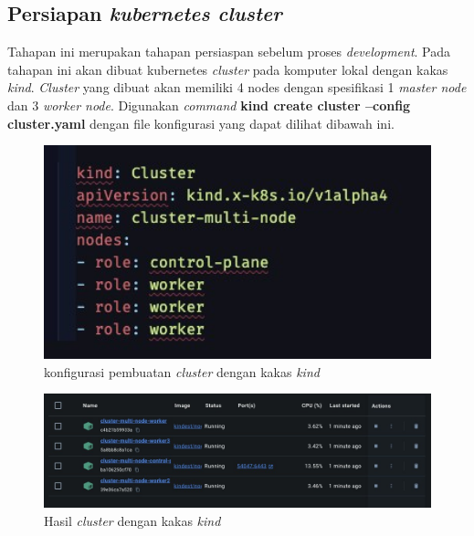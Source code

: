 \subsection{Persiapan \textit{kubernetes cluster}}

Tahapan ini merupakan tahapan persiaspan sebelum proses \textit{development}. Pada tahapan ini akan dibuat kubernetes \textit{cluster} pada komputer lokal dengan kakas \textit{kind}. \textit{Cluster} yang dibuat akan memiliki 4 nodes dengan spesifikasi 1 \textit{master node} dan 3 \textit{worker node}. Digunakan \textit{command} \textbf{kind create cluster --config cluster.yaml} dengan file konfigurasi yang dapat dilihat dibawah ini.

\begin{figure}[ht]
  \centering
  \includegraphics[width=1\textwidth]{resources/appendix/pembuatan-cluster.jpg}
  \caption{konfigurasi pembuatan \textit{cluster} dengan kakas \textit{kind}}
  \label{fig:konfigurasi-pembuatan-cluster}
\end{figure}

\begin{figure}[ht]
  \centering
  \includegraphics[width=1\textwidth]{resources/chapter-4/cluster-kind.jpg}
  \caption{Hasil \textit{cluster} dengan kakas \textit{kind}}
  \label{fig:hasil-cluster-kind}
\end{figure}

\pagebreak